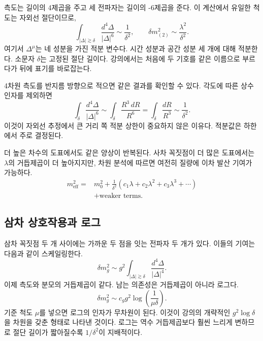 \begin{classroomqa}
\end{classroomqa}

측도는 길이의 4제곱을 주고 세 전파자는 길이의 -6제곱을 준다. 이 계산에서 유일한 척도는 자외선 절단이므로,
\begin{equation}
\int_{|\Delta|\gtrsim\delta}
\frac{d^4\Delta}{|\Delta|^6}
\sim\frac{1}{\delta^2},
\qquad
\delta m^2_{(2)}
\sim\frac{\lambda^2}{\delta^2}.
\label{eq:two-loop-scalar-mass}
\end{equation}
여기서 \(\Delta^\mu\)는 네 성분을 가진 적분 변수다. 시간 성분과 공간 성분 세 개에 대해 적분한다. 소문자 \(\delta\)는 고정된 절단 길이다. 강의에서는 처음에 두 기호를 같은 이름으로 부르다가 뒤에 표기를 바로잡는다.

4차원 측도를 반지름 방향으로 적으면 같은 결과를 확인할 수 있다. 각도에 따른 상수 인자를 제외하면
\begin{equation}
\int_{\delta}\frac{d^4\Delta}{|\Delta|^6}
\sim
\int_{\delta}\frac{R^3\,dR}{R^6}
=\int_{\delta}\frac{dR}{R^3}
\sim\frac{1}{\delta^2}.
\end{equation}
이것이 자외선 추정에서 큰 거리 쪽 적분 상한이 중요하지 않은 이유다. 적분값은 하한에서 주로 결정된다.

더 높은 차수의 도표에서도 같은 양상이 반복된다. 사차 꼭짓점이 더 많은 도표에서는 \(\lambda\)의 거듭제곱이 더 높아지지만, 차원 분석에 따르면 여전히 질량에 이차 발산 기여가 가능하다.
\begin{equation}
\begin{aligned}
m_{\mathrm{eff}}^2
={}&m_0^2
+\frac{1}{\delta^2}
\left(c_1\lambda+c_2\lambda^2+c_3\lambda^3+\cdots\right)\\
&+\text{weaker terms}.
\end{aligned}
\label{eq:scalar-mass-series}
\end{equation}

\subsection{삼차 상호작용과 로그}

삼차 꼭짓점 두 개 사이에는 가까운 두 점을 잇는 전파자 두 개가 있다. 이들의 기여는 다음과 같이 스케일링한다.
\begin{equation}
\delta m_g^2
\sim
g^2\int_{|\Delta|\gtrsim\delta}
\frac{d^4\Delta}{|\Delta|^4}.
\label{eq:cubic-loop}
\end{equation}
이제 측도와 분모의 거듭제곱이 같다. 남는 의존성은 거듭제곱이 아니라 로그다.
\begin{equation}
\delta m_g^2
\sim
c_g g^2\log\!\left(\frac{1}{\mu\delta}\right).
\label{eq:cubic-log}
\end{equation}
기준 척도 \(\mu\)를 넣으면 로그의 인자가 무차원이 된다. 이것이 강의의 개략적인 \(g^2\log\delta\)을 차원을 갖춘 형태로 나타낸 것이다. 로그는 역수 거듭제곱보다 훨씬 느리게 변하므로 절단 길이가 짧아질수록 \(1/\delta^2\)이 지배적이다.

